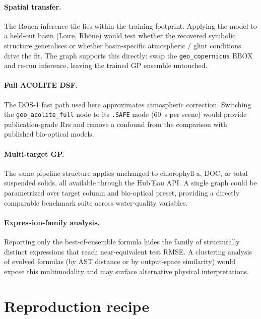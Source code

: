 \documentclass[11pt,a4paper]{article}
\begin{document}
\paragraph{Spatial transfer.}
The Rouen inference tile lies within the training footprint. Applying the model to a held-out basin (Loire, Rhône) would test whether the recovered symbolic structure generalises or whether basin-specific atmospheric / glint conditions drive the fit. The graph supports this directly: swap the \texttt{geo\_copernicus} BBOX and re-run inference, leaving the trained GP ensemble untouched.

\paragraph{Full ACOLITE DSF.}
The DOS-1 fast path used here approximates atmospheric correction. Switching the \texttt{geo\_acolite\_full} node to its \texttt{.SAFE} mode (\SI{60}{\second} per scene) would provide publication-grade Rrs and remove a confound from the comparison with published bio-optical models.

\paragraph{Multi-target GP.}
The same pipeline structure applies unchanged to chlorophyll-a, DOC, or total suspended solids, all available through the Hub'Eau API. A single graph could be parametrized over target column and bio-optical preset, providing a directly comparable benchmark suite across water-quality variables.

\paragraph{Expression-family analysis.}
Reporting only the best-of-ensemble formula hides the family of structurally distinct expressions that reach near-equivalent test RMSE. A clustering analysis of evolved formulas (by AST distance or by output-space similarity) would expose this multimodality and may surface alternative physical interpretations.

\section{Reproduction recipe}
\label{sec:repro}
\end{document}
